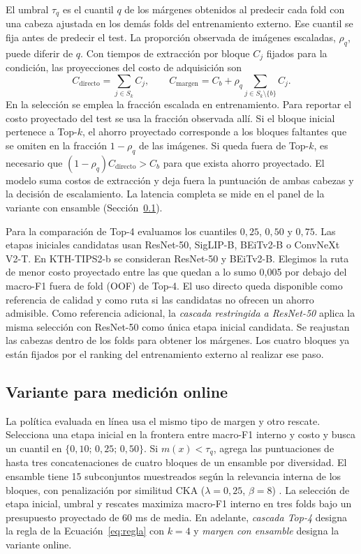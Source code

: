 \documentclass[a4paper,fleqn]{cas-sc}
\begin{document}
El umbral $\tau_q$ es el cuantil $q$ de los márgenes obtenidos al predecir cada fold con una cabeza ajustada en los demás folds del entrenamiento externo. Ese cuantil se fija antes de predecir el test. La proporción observada de imágenes escaladas, $\rho_q$, puede diferir de $q$. Con tiempos de extracción por bloque $C_j$ fijados para la condición, las proyecciones del costo de adquisición son
\begin{equation}
 C_{\mathrm{directo}}=\sum_{j\in S_k} C_j,\qquad
 C_{\mathrm{margen}}= C_b + \rho_q \sum_{j\in S_k\setminus\{b\}}C_j.
 \label{eq:costos}
\end{equation}
En la selección se emplea la fracción escalada en entrenamiento. Para reportar el costo proyectado del test se usa la fracción observada allí. Si el bloque inicial pertenece a Top-$k$, el ahorro proyectado corresponde a los bloques faltantes que se omiten en la fracción $1-\rho_q$ de las imágenes. Si queda fuera de Top-$k$, es necesario que $(1-\rho_q)C_{\mathrm{directo}}>C_b$ para que exista ahorro proyectado. El modelo suma costos de extracción y deja fuera la puntuación de ambas cabezas y la decisión de escalamiento. La latencia completa se mide en el panel de la variante con ensamble (Sección~\ref{sec:variante-panel}).

Para la comparación de Top-4 evaluamos los cuantiles $0{,}25$, $0{,}50$ y $0{,}75$. Las etapas iniciales candidatas usan ResNet-50, SigLIP-B, BEiTv2-B o ConvNeXt V2-T. En KTH-TIPS2-b se consideran ResNet-50 y BEiTv2-B. Elegimos la ruta de menor costo proyectado entre las que quedan a lo sumo 0,005 por debajo del macro-F1 fuera de fold (OOF) de Top-4. El uso directo queda disponible como referencia de calidad y como ruta si las candidatas no ofrecen un ahorro admisible. Como referencia adicional, la \emph{cascada restringida a ResNet-50} aplica la misma selección con ResNet-50 como única etapa inicial candidata. Se reajustan las cabezas dentro de los folds para obtener los márgenes. Los cuatro bloques ya están fijados por el ranking del entrenamiento externo al realizar ese paso.

\subsection{Variante para medición online}\label{sec:variante-panel}

La política evaluada en línea usa el mismo tipo de margen y otro rescate. Selecciona una etapa inicial en la frontera entre macro-F1 interno y costo y busca un cuantil en $\{0{,}10;\,0{,}25;\,0{,}50\}$. Si $m(x)<\tau_q$, agrega las puntuaciones de hasta tres concatenaciones de cuatro bloques de un ensamble por diversidad. El ensamble tiene 15 subconjuntos muestreados según la relevancia interna de los bloques, con penalización por similitud CKA ($\lambda=0{,}25$, $\beta=8$) \citep{kornblith2019similarity}. La selección de etapa inicial, umbral y rescates maximiza macro-F1 interno en tres folds bajo un presupuesto proyectado de 60 ms de media. En adelante, \emph{cascada Top-4} designa la regla de la Ecuación~\eqref{eq:regla} con $k=4$ y \emph{margen con ensamble} designa la variante online.
\end{document}

